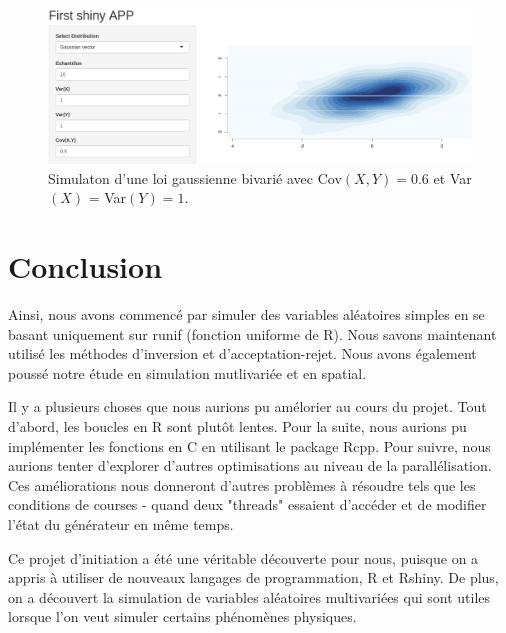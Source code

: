 \documentclass[10pt]{article} %
\begin{document}
\begin{figure}[h!]
\centering
\includegraphics[width=\linewidth]{media/rshiny_gauss.png}
\caption{Simulaton d'une loi gaussienne bivarié avec Cov$(X, Y) = 0.6$ et Var$(X)$ = Var$(Y) = 1$.}
\end{figure}

\section{Conclusion}

Ainsi, nous avons commencé par simuler des variables aléatoires simples en se basant uniquement sur runif (fonction uniforme de R). Nous savons maintenant utilisé les méthodes d'inversion et d'acceptation-rejet. Nous avons également poussé notre étude en simulation mutlivariée et en spatial. 

Il y a plusieurs choses que nous aurions pu amélorier au cours du projet.
Tout d'abord, les boucles en R sont plutôt lentes. Pour la suite, nous aurions pu implémenter les fonctions en C en utilisant le package Rcpp. Pour suivre, nous aurions tenter d'explorer d'autres optimisations au niveau de la parallélisation. Ces améliorations nous donneront d'autres problèmes à résoudre tels que les conditions de courses - quand deux "threads" essaient d'accéder et
de modifier l'état du générateur en même temps.


Ce projet d'initiation a été une véritable découverte pour nous, puisque on a appris à utiliser de nouveaux langages de programmation, R et Rshiny. De plus, on a découvert la simulation de variables aléatoires multivariées qui sont utiles lorsque l'on veut simuler certains phénomènes physiques.
\end{document}
